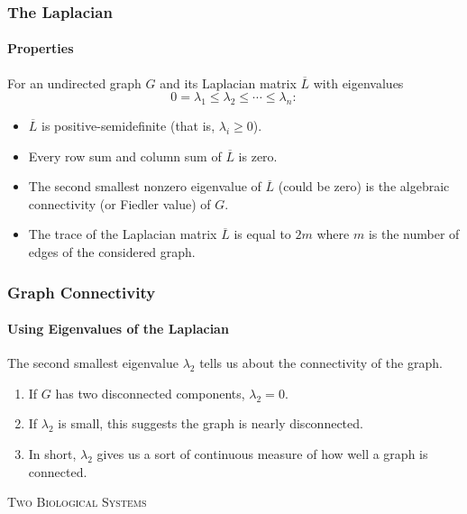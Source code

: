 \documentclass[aspectratio=43,leqno]{beamer}
\begin{document}
\begin{frame}
  \frametitle{The Laplacian}
  \framesubtitle{Properties}

  For an undirected graph $G$ and its Laplacian matrix $\overline{L}$ with eigenvalues 
\begin{displaymath}
0 = \lambda_1 \leq \lambda_2 \leq \cdots \leq \lambda_{n}:
\end{displaymath} 
\begin{itemize}
\item\label{item:3} $\overline{L}$ is positive-semidefinite (that is, $\lambda_i \geq 0$). \pause 
\item\label{item:28} Every row sum and column sum of $\overline{L}$ is zero. \pause
\item\label{item:29} The second smallest nonzero eigenvalue of $\overline{L}$ (could be zero) is the algebraic connectivity (or Fiedler value) of $G$. \pause
\item The trace of the Laplacian matrix $\overline{L}$ is equal to $2m$ where $m$ is the number of edges of the considered graph.
\end{itemize}
\end{frame} 

\begin{frame}
  \frametitle{Graph Connectivity}
  \framesubtitle{Using Eigenvalues of the Laplacian}

  The second smallest eigenvalue $\lambda_2$ tells us about the connectivity of the graph. \pause
\begin{enumerate}
\item\label{item:31} If $G$ has two disconnected components, $\lambda_2 = 0$. \pause
\item\label{item:32} If $\lambda_2$ is small, this suggests the graph is nearly disconnected. \pause
\item\label{item:33} In short, $\lambda_2$ gives us a sort of continuous measure of how well a graph is connected.
\end{enumerate}
\end{frame}


\begin{frame}
  \vfill
\begin{center}
  \textsc{Two Biological Systems}
\end{center}
  \vfill
\end{frame}
\end{document}
